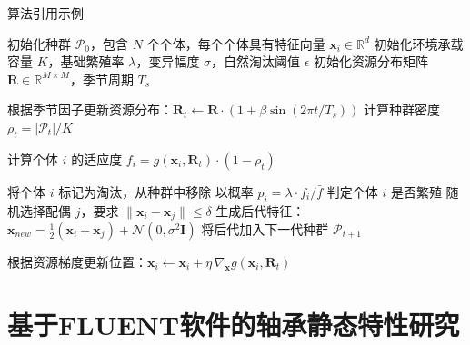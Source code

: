 \documentclass[a4paper, twoside, openany]{NCEPUMaster_Original}
\begin{document}
算法引用示例  %


\begin{algorithm}[h]
  \caption{基于个体模拟的种群动态演化算法}
  \label{alg:population-sim}
  \begin{algorithmic}[1]
    \STATE 初始化种群 $\mathcal{P}_0$，包含 $N$ 个个体，每个个体具有特征向量 $\mathbf{x}_i \in \mathbb{R}^d$
    \STATE 初始化环境承载容量 $K$，基础繁殖率 $\lambda$，变异幅度 $\sigma$，自然淘汰阈值 $\epsilon$
    \STATE 初始化资源分布矩阵 $\mathbf{R} \in \mathbb{R}^{M \times M}$，季节周期 $T_s$

      \STATE 根据季节因子更新资源分布：$\mathbf{R}_t \gets \mathbf{R} \cdot (1 + \beta \sin(2\pi t / T_s))$
      \STATE 计算种群密度 $\rho_t = |\mathcal{P}_t| / K$

        \STATE 计算个体 $i$ 的适应度 $f_i = g(\mathbf{x}_i, \mathbf{R}_t) \cdot (1 - \rho_t)$

          \STATE 将个体 $i$ 标记为淘汰，从种群中移除
        \ELSE
          \STATE 以概率 $p_i = \lambda \cdot f_i / \bar{f}$ 判定个体 $i$ 是否繁殖
            \STATE 随机选择配偶 $j$，要求 $\|\mathbf{x}_i - \mathbf{x}_j\| \leq \delta$
            \STATE 生成后代特征：$\mathbf{x}_{new} = \frac{1}{2}(\mathbf{x}_i + \mathbf{x}_j) + \mathcal{N}(0, \sigma^2 \mathbf{I})$
            \STATE 将后代加入下一代种群 $\mathcal{P}_{t+1}$
          \ENDIF
        \ENDIF
      \ENDWHILE

        \STATE 根据资源梯度更新位置：$\mathbf{x}_i \gets \mathbf{x}_i + \eta \, \nabla_{\mathbf{x}} g(\mathbf{x}_i, \mathbf{R}_t)$
      \ENDFOR
    \ENDFOR
  \end{algorithmic}
\end{algorithm}

\chapter{基于FLUENT软件的轴承静态特性研究}

\end{document}
